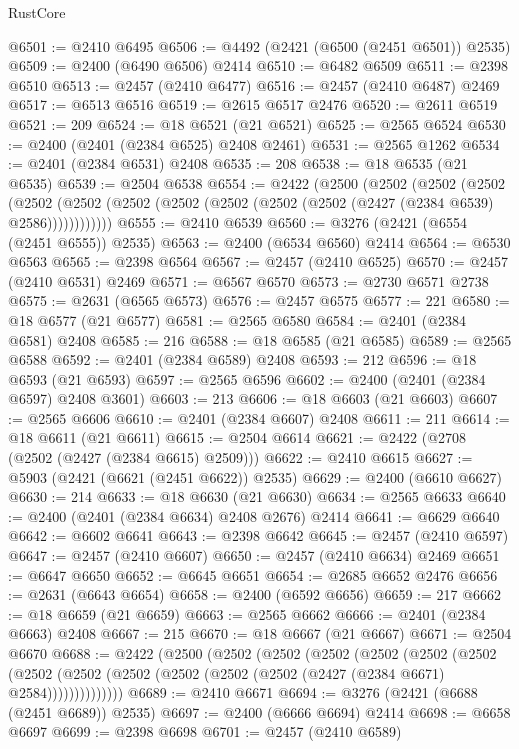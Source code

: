 \begin{lexlean}{RustCore}
\begin{coremodule}
@6501 := @2410 @6495
@6506 := @4492 (@2421 (@6500 (@2451 @6501)) @2535)
@6509 := @2400 (@6490 @6506) @2414
@6510 := @6482 @6509
@6511 := @2398 @6510
@6513 := @2457 (@2410 @6477)
@6516 := @2457 (@2410 @6487) @2469
@6517 := @6513 @6516
@6519 := @2615 @6517 @2476
@6520 := @2611 @6519
@6521 := 209
@6524 := @18 @6521 (@21 @6521)
@6525 := @2565 @6524
@6530 := @2400 (@2401 (@2384 @6525) @2408 @2461)
@6531 := @2565 @1262
@6534 := @2401 (@2384 @6531) @2408
@6535 := 208
@6538 := @18 @6535 (@21 @6535)
@6539 := @2504 @6538
@6554 := @2422
    (@2500
      (@2502
        (@2502
          (@2502
            (@2502 (@2502 (@2502 (@2502 (@2502 (@2502 (@2502 (@2427 (@2384 @6539) @2586))))))))))))
@6555 := @2410 @6539
@6560 := @3276 (@2421 (@6554 (@2451 @6555)) @2535)
@6563 := @2400 (@6534 @6560) @2414
@6564 := @6530 @6563
@6565 := @2398 @6564
@6567 := @2457 (@2410 @6525)
@6570 := @2457 (@2410 @6531) @2469
@6571 := @6567 @6570
@6573 := @2730 @6571 @2738
@6575 := @2631 (@6565 @6573)
@6576 := @2457 @6575
@6577 := 221
@6580 := @18 @6577 (@21 @6577)
@6581 := @2565 @6580
@6584 := @2401 (@2384 @6581) @2408
@6585 := 216
@6588 := @18 @6585 (@21 @6585)
@6589 := @2565 @6588
@6592 := @2401 (@2384 @6589) @2408
@6593 := 212
@6596 := @18 @6593 (@21 @6593)
@6597 := @2565 @6596
@6602 := @2400 (@2401 (@2384 @6597) @2408 @3601)
@6603 := 213
@6606 := @18 @6603 (@21 @6603)
@6607 := @2565 @6606
@6610 := @2401 (@2384 @6607) @2408
@6611 := 211
@6614 := @18 @6611 (@21 @6611)
@6615 := @2504 @6614
@6621 := @2422 (@2708 (@2502 (@2427 (@2384 @6615) @2509)))
@6622 := @2410 @6615
@6627 := @5903 (@2421 (@6621 (@2451 @6622)) @2535)
@6629 := @2400 (@6610 @6627)
@6630 := 214
@6633 := @18 @6630 (@21 @6630)
@6634 := @2565 @6633
@6640 := @2400 (@2401 (@2384 @6634) @2408 @2676) @2414
@6641 := @6629 @6640
@6642 := @6602 @6641
@6643 := @2398 @6642
@6645 := @2457 (@2410 @6597)
@6647 := @2457 (@2410 @6607)
@6650 := @2457 (@2410 @6634) @2469
@6651 := @6647 @6650
@6652 := @6645 @6651
@6654 := @2685 @6652 @2476
@6656 := @2631 (@6643 @6654)
@6658 := @2400 (@6592 @6656)
@6659 := 217
@6662 := @18 @6659 (@21 @6659)
@6663 := @2565 @6662
@6666 := @2401 (@2384 @6663) @2408
@6667 := 215
@6670 := @18 @6667 (@21 @6667)
@6671 := @2504 @6670
@6688 := @2422
    (@2500
      (@2502
        (@2502
          (@2502
            (@2502
              (@2502
                (@2502
                  (@2502 (@2502 (@2502 (@2502 (@2502 (@2502 (@2427 (@2384 @6671) @2584))))))))))))))
@6689 := @2410 @6671
@6694 := @3276 (@2421 (@6688 (@2451 @6689)) @2535)
@6697 := @2400 (@6666 @6694) @2414
@6698 := @6658 @6697
@6699 := @2398 @6698
@6701 := @2457 (@2410 @6589)

\end{coremodule}
\end{lexlean}

